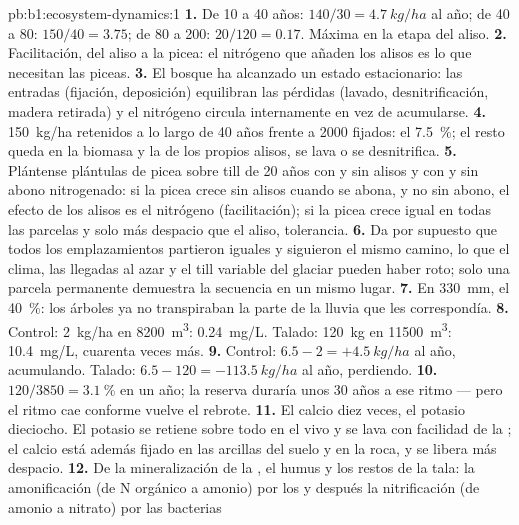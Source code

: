 \begin{solution}{pb:b1:ecosystem-dynamics:1}
\textbf{1.} De 10 a 40 años: $140/30 = \qty{4.7}{kg/ha}$ al año; de 40 a 80:
$150/40 = \num{3.75}$; de 80 a 200: $20/120 = \num{0.17}$. Máxima en la
etapa del aliso.
\textbf{2.} Facilitación, del aliso a la picea: el nitrógeno que añaden los
alisos es lo que necesitan las piceas.
\textbf{3.} El bosque ha alcanzado un estado estacionario: las entradas
(fijación, deposición) equilibran las pérdidas (lavado, desnitrificación,
madera retirada) y el nitrógeno circula internamente en vez de acumularse.
\textbf{4.} \qty{150}{kg/ha} retenidos a lo largo de 40 años frente a
\num{2000} fijados: el \qty{7.5}{\%}; el resto queda en la biomasa y la
 de los propios alisos, se lava o se desnitrifica.
\textbf{5.} Plántense plántulas de picea sobre till de 20 años con y sin
alisos y con y sin abono nitrogenado: si la picea crece sin alisos cuando se
abona, y no sin abono, el efecto de los alisos es el nitrógeno
(facilitación); si la picea crece igual en todas las parcelas y solo más
despacio que el aliso, tolerancia.
\textbf{6.} Da por supuesto que todos los emplazamientos partieron iguales y
siguieron el mismo camino, lo que el clima, las llegadas al azar y el till
variable del glaciar pueden haber roto; solo una parcela permanente
demuestra la secuencia en un mismo lugar.
\textbf{7.} En \qty{330}{mm}, el \qty{40}{\%}: los árboles ya no
transpiraban la parte de la lluvia que les correspondía.
\textbf{8.} Control: \qty{2}{kg/ha} en \qty{8200}{m^3}: \qty{0.24}{mg/L}.
Talado: \qty{120}{kg} en \qty{11500}{m^3}: \qty{10.4}{mg/L}, cuarenta veces
más.
\textbf{9.} Control: $6.5 - 2 = +\qty{4.5}{kg/ha}$ al año, acumulando.
Talado: $6.5 - 120 = -\qty{113.5}{kg/ha}$ al año, perdiendo.
\textbf{10.} $120/3850 = \qty{3.1}{\%}$ en un año; la reserva duraría unos
\num{30} años a ese ritmo --- pero el ritmo cae conforme vuelve el rebrote.
\textbf{11.} El calcio diez veces, el potasio dieciocho. El potasio se
retiene sobre todo en el  vivo y se lava con facilidad de la
; el calcio está además fijado en las arcillas del suelo y en la
roca, y se libera más despacio.
\textbf{12.} De la mineralización de la , el humus y los restos de
la tala: la amonificación (de N orgánico a amonio) por los  y
después la nitrificación (de amonio a nitrato) por las bacterias

\end{solution}
